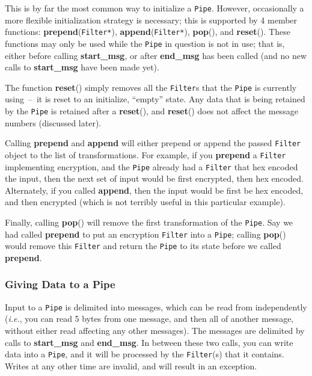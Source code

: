 \documentclass{article}
\newcommand{\function}[1]{\textbf{#1}}
\newcommand{\type}[1]{\texttt{#1}}
\newcommand{\ie}[0]{\emph{i.e.}}
\begin{document}
This is by far the most common way to initialize a \type{Pipe}. However,
occasionally a more flexible initialization strategy is necessary; this is
supported by 4 member functions: \function{prepend}(\type{Filter*}),
\function{append}(\type{Filter*}), \function{pop}(), and \function{reset}().
These functions may only be used while the \type{Pipe} in question is not in
use; that is, either before calling \function{start\_msg}, or after
\function{end\_msg} has been called (and no new calls to \function{start\_msg}
have been made yet).

The function \function{reset}() simply removes all the \type{Filter}s
that the \type{Pipe} is currently using~--~it is reset to an
initialize, ``empty'' state.  Any data that is being retained by the
\type{Pipe} is retained after a \function{reset}(), and
\function{reset}() does not affect the message numbers (discussed
later).

Calling \function{prepend} and \function{append} will either prepend
or append the passed \type{Filter} object to the list of
transformations. For example, if you \function{prepend} a
\type{Filter} implementing encryption, and the \type{Pipe} already had
a \type{Filter} that hex encoded the input, then the next set of
input would be first encrypted, then hex encoded. Alternately, if you
called \function{append}, then the input would be first be hex
encoded, and then encrypted (which is not terribly useful in this
particular example).

Finally, calling \function{pop}() will remove the first transformation
of the \type{Pipe}. Say we had called \function{prepend} to put an
encryption \type{Filter} into a \type{Pipe}; calling \function{pop}()
would remove this \type{Filter} and return the \type{Pipe} to its
state before we called \function{prepend}.

\subsubsection{Giving Data to a Pipe}

Input to a \type{Pipe} is delimited into messages, which can be read from
independently (\ie, you can read 5 bytes from one message, and then all of
another message, without either read affecting any other messages). The
messages are delimited by calls to \function{start\_msg} and
\function{end\_msg}. In between these two calls, you can write data into a
\type{Pipe}, and it will be processed by the \type{Filter}(s) that it
contains. Writes at any other time are invalid, and will result in an
exception.
\end{document}
